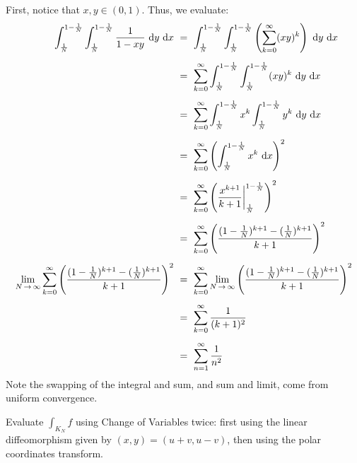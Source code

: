 \begin{soln}
    First, notice that $ x,y \in (0,1) $. Thus, we evaluate:
    \begin{align*}
        \int_{\frac{1}{N}}^{1-\frac{1}{N}}\int_{\frac{1}{N}}^{1-\frac{1}{N}}
        \frac{1}{1-xy}\di y\di x & \ = \
        \int_{\frac{1}{N}}^{1-\frac{1}{N}}\int_{\frac{1}{N}}^{1-\frac{1}{N}}
        \left( \sum_{k=0}^{\infty}(xy)^{k} \right)\di y\di x \vsp
        & \ = \ \sum_{k=0}^{\infty}\int_{\frac{1}{N}}^{1-\frac{1}{N}}
        \int_{\frac{1}{N}}^{1-\frac{1}{N}} (xy)^{k}\di y\di x \vsp
        & \ = \ \sum_{k=0}^{\infty}\int_{\frac{1}{N}}^{1-\frac{1}{N}} x^{k}
        \int_{\frac{1}{N}}^{1-\frac{1}{N}} y^{k}\di y\di x \vsp
        & \ = \ \sum_{k=0}^{\infty}\left(\int_{\frac{1}{N}}^{1-\frac{1}{N}}x^{k}
        \di x \right)^{2} \vsp
        & \ = \ \sum_{k=0}^{\infty}\left(\frac{x^{k+1}}{k+1}\bigg\rvert_{\frac{1}
        {N}}^{1-\frac{1}{N}}\right)^{2} \vsp
        & \ = \ \sum_{k=0}^{\infty}\left(\frac{(1-\frac{1}{N})^{k+1}-(\frac{1}
        {N})^{k+1}}{k+1}\right)^{2} \vsp
        \lim_{N\sto\infty}\sum_{k=0}^{\infty}\left(\frac{(1-\frac{1}{N})^{k+1}-
                (\frac{1}{N})^{k+1}}{k+1}\right)^{2}
        & \ = \ \sum_{k=0}^{\infty}\lim_{N\sto\infty}\left(\frac{(1-\frac{1}
                {N})^{k+1}-(\frac{1}{N})^{k+1}}{k+1}\right)^{2} \vsp
        & \ = \ \sum_{k=0}^{\infty}\frac{1}{(k+1)^{2}} \vsp
        & \ = \ \sum_{n=1}^{\infty}\frac{1}{n^{2}}
    \end{align*}
    Note the swapping of the integral and sum, and sum and limit, come from
    uniform convergence.
\end{soln}

\begin{qu}[num=38.2]
    Evaluate $ \displaystyle\int_{K_{N}}f $ using Change of Variables twice:
    first using the linear diffeomorphism given by $ (x,y) = (u+v, u-v) $,
    then using the polar coordinates transform.
\end{qu}

